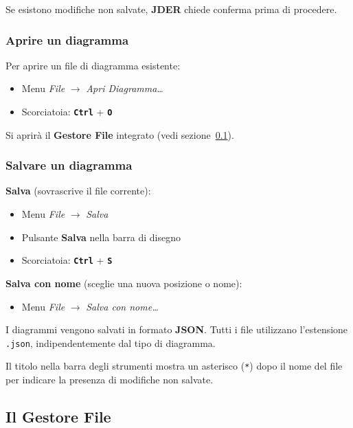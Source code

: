 \documentclass[a4paper,11pt]{article}
\newcommand{\key}[1]{\texttt{\textbf{#1}}}
\newcommand{\menu}[1]{\textit{#1}}
\newcommand{\uielement}[1]{\textbf{#1}}
\newcommand{\jder}{\textbf{JDER}}
\begin{document}
Se esistono modifiche non salvate, \jder{} chiede conferma prima di procedere.

\subsubsection{Aprire un diagramma}

Per aprire un file di diagramma esistente:
\begin{itemize}
  \item Menu \menu{File} $\to$ \menu{Apri Diagramma\ldots}
  \item Scorciatoia: \key{Ctrl} + \key{O}
\end{itemize}

Si aprirà il \textbf{Gestore File} integrato (vedi sezione~\ref{sec:filemanager}).

\subsubsection{Salvare un diagramma}

\textbf{Salva} (sovrascrive il file corrente):
\begin{itemize}
  \item Menu \menu{File} $\to$ \menu{Salva}
  \item Pulsante \uielement{Salva} nella barra di disegno
  \item Scorciatoia: \key{Ctrl} + \key{S}
\end{itemize}

\textbf{Salva con nome} (sceglie una nuova posizione o nome):
\begin{itemize}
  \item Menu \menu{File} $\to$ \menu{Salva con nome\ldots}
\end{itemize}

I diagrammi vengono salvati in formato \textbf{JSON}. Tutti i file utilizzano l'estensione \texttt{.json},
indipendentemente dal tipo di diagramma.

\begin{tcolorbox}[notebox, title={Nota}]
  Il titolo nella barra degli strumenti mostra un asterisco (\texttt{*}) dopo il nome del file
  per indicare la presenza di modifiche non salvate.
\end{tcolorbox}

\subsection{Il Gestore File}
\label{sec:filemanager}
\end{document}
